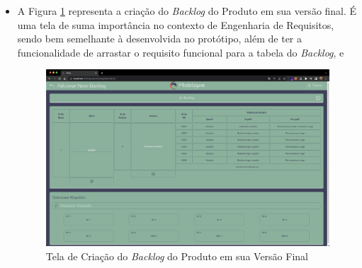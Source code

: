 \begin{itemize}
    \item A Figura \ref{fig:backlog_implementado} representa a criação do \textit{Backlog} do Produto em sua versão final. É uma tela de suma importância no contexto de Engenharia de Requisitos, sendo bem semelhante à desenvolvida no protótipo, além de ter a funcionalidade de arrastar o requisito funcional para a tabela do \textit{Backlog}, e
    \begin{figure}[]
      \begin{center}
          \caption{{Tela de Criação do \textit{Backlog} do Produto em sua Versão Final}}
          \label{fig:backlog_implementado}
          \includegraphics[scale=0.22]{figuras/TelasDesenvolvidas/backlog-implementado.png}
    \end{center}
    \end{figure}


\end{itemize}
